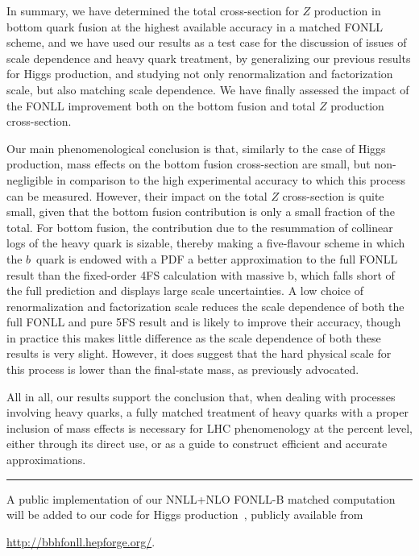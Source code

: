 \documentclass[12pt]{article}
\begin{document}
In summary, we have determined the total cross-section for $Z$
production in bottom quark fusion at the highest available accuracy in
a matched FONLL scheme,  and we have used our results as a test case for the
discussion of issues of scale dependence and heavy quark treatment, by
generalizing our previous results for Higgs production, and studying
not only renormalization and factorization scale, but also matching
scale dependence. We have finally assessed the impact of the FONLL
improvement both on the bottom fusion and total $Z$ production
cross-section. 

Our main phenomenological conclusion is that,
similarly to the case of Higgs production,  mass effects on the bottom
fusion cross-section are small,
but non-negligible in comparison to the high experimental accuracy to
which this process can be measured. However, their impact on the total $Z$
cross-section is quite small, given that the bottom fusion contribution
is only a small fraction of the total.
For bottom fusion, the contribution due to the
resummation of collinear logs of the heavy quark is sizable, thereby
making a five-flavour scheme in which the $b$~quark is endowed with a PDF
a better approximation to the full FONLL result than the fixed-order
4FS calculation with massive b, which falls short of the full
prediction and displays large scale uncertainties. 
A low choice of
renormalization and factorization scale reduces the scale dependence
of both the full FONLL and pure 5FS result and is likely to improve
their accuracy, though in practice this makes little difference as the scale
dependence of both these results is very slight. However, it
does suggest that the hard physical scale for this process is
lower than the final-state mass, as previously advocated.


All in all, our results support the conclusion that, when dealing with
processes involving heavy quarks, a fully matched
treatment of heavy quarks with a proper inclusion of mass effects is
necessary for LHC phenomenology at the percent level, either through
its direct use, or as a guide to construct efficient and accurate
approximations. 

\bigskip
\bigskip
\begin{center}
  \rule{5cm}{.1pt}
\end{center}
\bigskip
\bigskip


A public implementation of our  NNLL+NLO FONLL-B matched computation
will be added to our code for Higgs
production~\cite{Forte:2016sja}, publicly available from 
\begin{center}
  \url{http://bbhfonll.hepforge.org/}.
\end{center}
\end{document}
